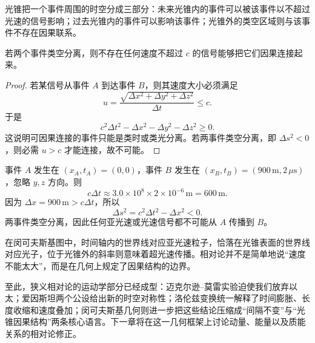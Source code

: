 光锥把一个事件周围的时空分成三部分：未来光锥内的事件可以被该事件以不超过光速的信号影响；过去光锥内的事件可以影响该事件；光锥外的类空区域则与该事件不存在因果联系。

\begin{theorem}[因果约束]
若两个事件类空分离，则不存在任何速度不超过 $c$ 的信号能够把它们因果连接起来。
\end{theorem}

\begin{proof}
若某信号从事件 $A$ 到达事件 $B$，则其速度大小必须满足
\[
 u=\frac{\sqrt{\Delta x^2+\Delta y^2+\Delta z^2}}{\Delta t}\le c.
\]
于是
\[
 c^2\Delta t^2-\Delta x^2-\Delta y^2-\Delta z^2\ge 0.
\]
这说明可因果连接的事件只能是类时或类光分离。若两事件类空分离，即 $\Delta s^2<0$，则必需 $u>c$ 才能连接，故不可能。
\end{proof}

\begin{example}[判断两个事件是否可能有因果关系]
事件 $A$ 发生在 $(x_A,t_A)=(0,0)$，事件 $B$ 发生在 $(x_B,t_B)=(900\,\mathrm{m},2\,\mu\mathrm{s})$，忽略 $y,z$ 方向。则
\[
 c\Delta t\approx 3.0\times 10^8\times 2\times 10^{-6}\,\mathrm{m}=600\,\mathrm{m}.
\]
因为 $\Delta x=900\,\mathrm{m}>c\Delta t$，所以
\[
\Delta s^2=c^2\Delta t^2-\Delta x^2<0.
\]
两事件类空分离，因此任何亚光速或光速信号都不可能从 $A$ 传播到 $B$。
\end{example}

\begin{remark}
在闵可夫斯基图中，时间轴内的世界线对应亚光速粒子，恰落在光锥表面的世界线对应光子，位于光锥外的斜率则意味着超光速传播。相对论并不是简单地说“速度不能太大”，而是在几何上规定了因果结构的边界。
\end{remark}

至此，狭义相对论的运动学部分已经成型：迈克尔逊--莫雷实验迫使我们放弃以太；爱因斯坦两个公设给出新的时空对称性；洛伦兹变换统一解释了时间膨胀、长度收缩和速度叠加；闵可夫斯基几何则进一步把这些结论压缩成“间隔不变”与“光锥因果结构”两条核心语言。下一章将在这一几何框架上讨论动量、能量以及质能关系的相对论修正。


